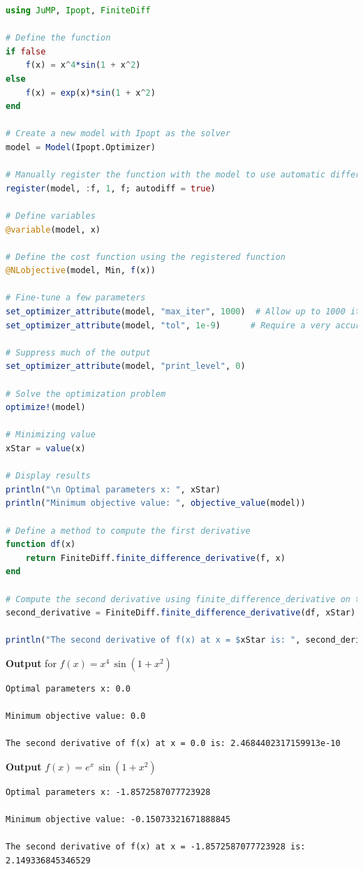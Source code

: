\begin{lstlisting}[language=Julia,style=mystyle]
using JuMP, Ipopt, FiniteDiff

# Define the function
if false
    f(x) = x^4*sin(1 + x^2)
else
    f(x) = exp(x)*sin(1 + x^2)
end

# Create a new model with Ipopt as the solver
model = Model(Ipopt.Optimizer)

# Manually register the function with the model to use automatic differentiation
register(model, :f, 1, f; autodiff = true)

# Define variables
@variable(model, x)

# Define the cost function using the registered function
@NLobjective(model, Min, f(x))

# Fine-tune a few parameters
set_optimizer_attribute(model, "max_iter", 1000)  # Allow up to 1000 iterations
set_optimizer_attribute(model, "tol", 1e-9)      # Require a very accurate solution

# Suppress much of the output
set_optimizer_attribute(model, "print_level", 0)

# Solve the optimization problem
optimize!(model)

# Minimizing value
xStar = value(x)

# Display results
println("\n Optimal parameters x: ", xStar)
println("Minimum objective value: ", objective_value(model))

# Define a method to compute the first derivative
function df(x)
    return FiniteDiff.finite_difference_derivative(f, x)
end

# Compute the second derivative using finite_difference_derivative on the first derivative function
second_derivative = FiniteDiff.finite_difference_derivative(df, xStar)

println("The second derivative of f(x) at x = $xStar is: ", second_derivative[1, 1])
\end{lstlisting}
\textbf{Output} for $f(x) = x^4\, \sin(1 + x^2)$
\begin{verbatim}
Optimal parameters x: 0.0

Minimum objective value: 0.0

The second derivative of f(x) at x = 0.0 is: 2.4684402317159913e-10
\end{verbatim}

\textbf{Output} $f(x) = e^x \, \sin(1 + x^2)$
\begin{verbatim}
Optimal parameters x: -1.8572587077723928

Minimum objective value: -0.15073321671888845

The second derivative of f(x) at x = -1.8572587077723928 is: 2.149336845346529
\end{verbatim}

